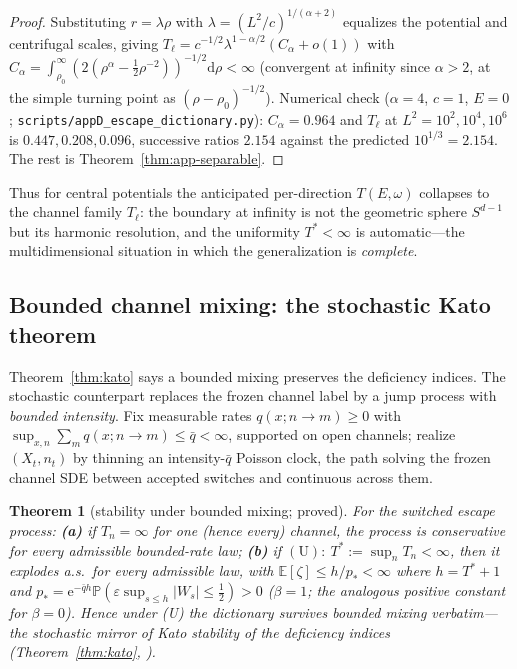 \documentclass[11pt]{article}
\newtheorem{theorem}{Theorem}[section]
\theoremstyle{definition}
\theoremstyle{remark}
\newcommand{\dd}{\mathrm{d}}
\newcommand{\ee}{\mathrm{e}}
\newcommand{\Prob}{\mathbb{P}}
\newcommand{\EE}{\mathbb{E}}
\begin{document}
\begin{proof}
Substituting $r=\lambda\rho$ with $\lambda=(L^{2}/c)^{1/(\alpha+2)}$
equalizes the potential and centrifugal scales, giving
$T_{\ell}=c^{-1/2}\lambda^{1-\alpha/2}(C_{\alpha}+o(1))$ with
$C_{\alpha}=\int_{\rho_{0}}^{\infty}
(2(\rho^{\alpha}-\tfrac12\rho^{-2}))^{-1/2}\dd\rho<\infty$ (convergent
at infinity since $\alpha>2$, at the simple turning point as
$(\rho-\rho_0)^{-1/2}$). Numerical check ($\alpha=4$, $c=1$, $E=0$;
\texttt{scripts/appD\_escape\_dictionary.py}): $C_{\alpha}=0.964$ and
$T_{\ell}$ at $L^{2}=10^{2},10^{4},10^{6}$ is $0.447,0.208,0.096$,
successive ratios $2.154$ against the predicted $10^{1/3}=2.154$. The
rest is Theorem~\ref{thm:app-separable}.
\end{proof}

Thus for central potentials the anticipated per-direction $T(E,\omega)$
collapses to the channel family $T_{\ell}$: the boundary at infinity is
not the geometric sphere $S^{d-1}$ but its harmonic resolution, and the
uniformity $T^{*}<\infty$ is automatic---the multidimensional situation
in which the generalization is \emph{complete}.

\subsection{Bounded channel mixing: the stochastic Kato theorem}
\label{app:multiD-bounded}

Theorem~\ref{thm:kato} says a bounded mixing preserves the deficiency
indices. The stochastic counterpart replaces the frozen channel label
by a jump process with \emph{bounded intensity}. Fix measurable rates
$q(x;n\to m)\ge0$ with $\sup_{x,n}\sum_{m}q(x;n\to
m)\le\bar q<\infty$, supported on open channels; realize $(X_{t},n_{t})$
by thinning an intensity-$\bar q$ Poisson clock, the path solving the
frozen channel SDE between accepted switches and continuous across them.

\begin{theorem}[stability under bounded mixing; proved]
\label{thm:app-kato}
For the switched escape process: \textbf{(a)} if $T_{n}=\infty$ for one
(hence every) channel, the process is conservative for \emph{every}
admissible bounded-rate law; \textbf{(b)} if
$(\mathrm U):\ T^{*}:=\sup_{n}T_{n}<\infty$, then it explodes a.s.\ for
every admissible law, with $\EE[\zeta]\le h/p_{*}<\infty$ where
$h=T^{*}+1$ and $p_{*}=\ee^{-\bar q h}
\Prob(\varepsilon\sup_{s\le h}|W_{s}|\le\tfrac12)>0$ ($\beta=1$; the
analogous positive constant for $\beta=0$). Hence under (U) the
dictionary survives bounded mixing verbatim---the stochastic mirror of
Kato stability of the deficiency indices (Theorem~\ref{thm:kato},
\cite{KatoBook}).
\end{theorem}
\end{document}

